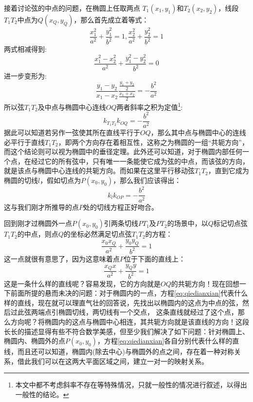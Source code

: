 接着讨论弦的中点的问题，在椭圆上任取两点 $T_1(x_1,y_1)$和$T_2(x_2,y_2)$，线段$T_1T_2$中点为$Q(x_Q,y_Q)$，那么首先成立着等式：
\begin{equation}
\frac{x_1^2}{a^2}+\frac{y_1^2}{b^2}=1, \frac{x_2^2}{a^2}+\frac{y_2^2}{b^2}=1
\end{equation}
两式相减得到:
\begin{equation}
\frac{x_1^2-x_2^2}{a^2}+\frac{y_1^2-y_2^2}{b^2}=0
\end{equation}
进一步变形为:
\begin{equation}
\frac{y_1-y_2}{x_1-x_2}\frac{\frac{y_1+y_2}{2}}{\frac{x_1+x_2}{2}}=-\frac{b^2}{a^2}
\end{equation}
所以弦$T_1T_2$及中点与椭圆中心连线$OQ$两者斜率之积为定值\footnote{本文中都不考虑斜率不存在等特殊情况，只就一般性的情况进行叙述，以得出一般性的结论。}:
\begin{equation}
k_{T_1T_2}k_{OQ}=-\frac{b^2}{a^2}
\end{equation}
据此可以知道若另作一弦使其所在直线平行于$OQ$，那么其中点与椭圆中心的连线必平行于直线$T_1T_2$，即两个方向存在着相互性，这称之为椭圆的一组“共轭方向”，而这个结论则可以视为椭圆中的垂径定理。此外还可以知道，对于椭圆内部任何一个点，在经过它的所有弦中，只有唯一一条能使它成为弦的中点，而该弦的方向，就是该点与椭圆中心连线的共轭方向。而如果在这里平行移动弦$T_1T_2$，直到它成为椭圆的切线$l$，假如切点为$P(x_0,y_0)$，那么我们应该得出：
\begin{equation}
k_l k_{OP}=-\frac{b^2}{a^2}
\end{equation}
这与我们刚才所推导的点$P$处的切线方程正好吻合。

回到刚才过椭圆外一点$P(x_0,y_0)$引两条切线$PT_1$及$PT_2$的场景中，以$Q$标记切点弦$T_1T_2$的中点，则点$Q$的坐标必然满足切点弦$T_1T_2$的方程：
\begin{equation}
\frac{x_0 x_Q}{a^2}+\frac{y_0 y_Q}{b^2} = 1 \label{eq:pq}
\end{equation}
这一点就很有意思了，因为这意味着点$P$位于下面的直线上：
\begin{equation}
\frac{x_Q x}{a^2}+\frac{y_Q y}{b^2} = 1 \label{abc}
\end{equation}
这是一条什么样的直线呢？容易发现，它的方向就是$OQ$的共轭方向！现在回想一下前面所提的悬而未决的问题：对于椭圆内的一点，方程\ref{eq:qiedianxian}代表什么样的直线，现在就可以理直气壮的回答说，先找出以椭圆内的这点为中点的弦，然后过此弦两端点引椭圆切线，两切线有一个交点，
这条直线就经过了这个点，那么方向呢？将椭圆内的这点与椭圆中心相连，其共轭方向就是该直线的方向！这段长长的描述显得有些不符合数学美感，但至少我们解决了如下问题：针对椭圆上、椭圆内、椭圆外的点$P(x_0,y_0)$，方程\ref{eq:qiedianxian}各自分别代表什么样的直线，而且还可以知道，椭圆内(除去中心)与椭圆外的点之间，存在着一种对称关系，借此我们可以在这两大平面区域之间，建立一对一的映射关系。

